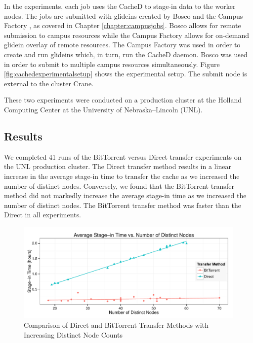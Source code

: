 In the experiments, each job uses the CacheD to stage-in data to the worker nodes.  The jobs are submitted with glideins created by Bosco \cite{weitzel2014accessing}  and the Campus Factory \cite{weitzel2011campus}, as covered in Chapter \ref{chapter:campusjobs}.  Bosco allows for remote submission to campus resources while the Campus Factory allows for on-demand glidein overlay of remote resources.  The Campus Factory was used in order to create and run glideins which, in turn, run the CacheD daemon.  Bosco was used in order to submit to multiple campus resources simultaneously.  Figure \ref{fig:cachedexperimentalsetup} shows the experimental setup.  The submit node is external to the cluster Crane.

These two experiments were conducted on a production cluster at the Holland Computing Center at the University of Nebraska--Lincoln (UNL).

\subsection{Results}

We completed 41 runs of the BitTorrent versus Direct transfer  experiments on the UNL production cluster.  The Direct transfer method results in a linear increase in the average stage-in time to transfer the cache as we increased the number of distinct nodes.  Conversely, we found that the BitTorrent transfer method did not markedly increase the average stage-in time as we increased the number of distinct nodes.  The BitTorrent transfer method was faster than the Direct in all experiments.


\begin{figure}[h!t]
\centering
\includegraphics[width=\textwidth]{images/CombinedPlot.pdf}
\caption{Comparison of Direct and BitTorrent Transfer Methods with Increasing Distinct Node Counts}
\label{fig:combinedgraph}
\end{figure}

